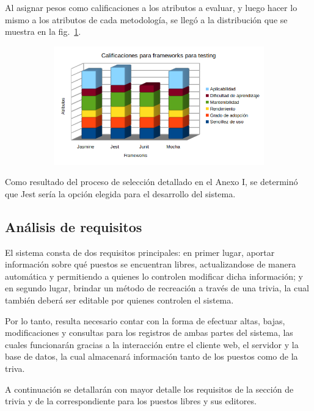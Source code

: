 \documentclass{article}
\begin{document}
Al asignar pesos como calificaciones a los atributos a evaluar, y luego hacer lo mismo a los atributos de cada metodología, se llegó a la distribución que se muestra en la fig.~\ref{fig:testing}.
\begin{figure}[H]
	\caption{Calificaciones para frameworks para testing}
    \begin{subfigure}{1\textwidth}
	\includegraphics[width=1\textwidth]{calificaciones para frameworks para testing.png}
    \end{subfigure}
	\label{fig:testing}
\end{figure}
\vspace{-1.0\baselineskip}
Como resultado del proceso de selección detallado en el Anexo I, se determinó que Jest sería la opción elegida para el desarrollo del sistema.
\newpage
\subsection{Análisis de requisitos}
El sistema consta de dos requisitos principales: en primer lugar, aportar información sobre qué puestos se encuentran libres, actualizandose de manera automática y permitiendo a quienes lo controlen modificar dicha información; y en segundo lugar, brindar un método de recreación a través de una trivia, la cual también deberá ser editable por quienes controlen el sistema.

Por lo tanto, resulta necesario contar con la forma de efectuar altas, bajas, modificaciones y consultas para los registros de ambas partes del sistema, las cuales funcionarán gracias a la interacción entre el cliente web, el servidor y la base de datos, la cual almacenará información tanto de los puestos como de la triva.

A continuación se detallarán con mayor detalle los requisitos de la sección de trivia y de la correspondiente para los puestos libres y sus editores.
\end{document}
